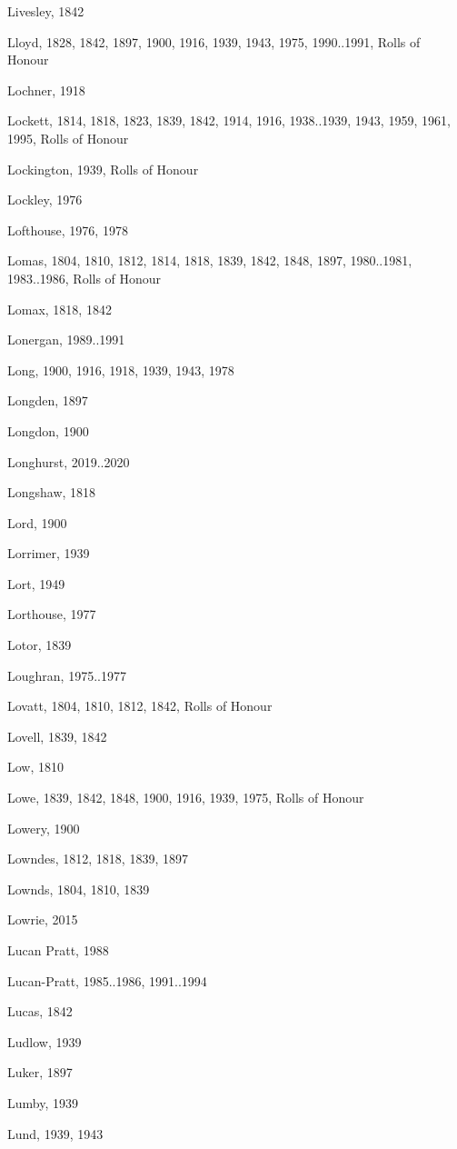 \begin{theindex}
\item Livesley, 1842
\item Lloyd, 1828, 1842, 1897, 1900, 1916, 1939, 1943, 1975, 1990..1991, Rolls of Honour
\item Lochner, 1918
\item Lockett, 1814, 1818, 1823, 1839, 1842, 1914, 1916, 1938..1939, 1943, 1959, 1961, 1995, Rolls of Honour
\item Lockington, 1939, Rolls of Honour
\item Lockley, 1976
\item Lofthouse, 1976, 1978
\item Lomas, 1804, 1810, 1812, 1814, 1818, 1839, 1842, 1848, 1897, 1980..1981, 1983..1986, Rolls of Honour
\item Lomax, 1818, 1842
\item Lonergan, 1989..1991
\item Long, 1900, 1916, 1918, 1939, 1943, 1978
\item Longden, 1897
\item Longdon, 1900
\item Longhurst, 2019..2020
\item Longshaw, 1818
\item Lord, 1900
\item Lorrimer, 1939
\item Lort, 1949
\item Lorthouse, 1977
\item Lotor, 1839
\item Loughran, 1975..1977
\item Lovatt, 1804, 1810, 1812, 1842, Rolls of Honour
\item Lovell, 1839, 1842
\item Low, 1810
\item Lowe, 1839, 1842, 1848, 1900, 1916, 1939, 1975, Rolls of Honour
\item Lowery, 1900
\item Lowndes, 1812, 1818, 1839, 1897
\item Lownds, 1804, 1810, 1839
\item Lowrie, 2015
\item Lucan Pratt, 1988
\item Lucan-Pratt, 1985..1986, 1991..1994
\item Lucas, 1842
\item Ludlow, 1939
\item Luker, 1897
\item Lumby, 1939
\item Lund, 1939, 1943

\end{theindex}
